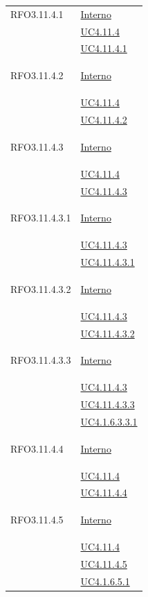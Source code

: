\begin{longtable}{|>{\centering}m{5cm}|m{5cm}<{\centering}|}
\hypertarget{RFO3.11.4.1}{RFO3.11.4.1} & \hyperlink{Interno}{Interno}\\
&\hyperref[UC4.11.4]{UC4.11.4}\\
&\hyperref[UC4.11.4.1]{UC4.11.4.1}\\ \hline

\hypertarget{RFO3.11.4.2}{RFO3.11.4.2} & \hyperlink{Interno}{Interno}\\
&\hyperref[UC4.11.4]{UC4.11.4}\\
&\hyperref[UC4.11.4.2]{UC4.11.4.2}\\ \hline

\hypertarget{RFO3.11.4.3}{RFO3.11.4.3} & \hyperlink{Interno}{Interno}\\
&\hyperref[UC4.11.4]{UC4.11.4}\\
&\hyperref[UC4.11.4.3]{UC4.11.4.3}\\ \hline

\hypertarget{RFO3.11.4.3.1}{RFO3.11.4.3.1} & \hyperlink{Interno}{Interno}\\
& \hyperref[UC4.11.4.3]{UC4.11.4.3}\\
& \hyperref[UC4.11.4.3.1]{UC4.11.4.3.1}\\ \hline

\hypertarget{RFO3.11.4.3.2}{RFO3.11.4.3.2} & \hyperlink{Interno}{Interno}\\
& \hyperref[UC4.11.4.3]{UC4.11.4.3}\\
& \hyperref[UC4.11.4.3.2]{UC4.11.4.3.2}\\ \hline

\hypertarget{RFO3.11.4.3.3}{RFO3.11.4.3.3} & \hyperlink{Interno}{Interno}\\
& \hyperref[UC4.11.4.3]{UC4.11.4.3}\\
&\hyperref[UC4.11.4.3.3]{UC4.11.4.3.3}\\
&\hyperref[UC4.1.6.3.3.1]{UC4.1.6.3.3.1}\\ \hline

\hypertarget{RFO3.11.4.4}{RFO3.11.4.4} & \hyperlink{Interno}{Interno}\\
&\hyperref[UC4.11.4]{UC4.11.4}\\
&\hyperref[UC4.11.4.4]{UC4.11.4.4}\\ \hline

\hypertarget{RFO3.11.4.5}{RFO3.11.4.5} & \hyperlink{Interno}{Interno}\\
&\hyperref[UC4.11.4]{UC4.11.4}\\
&\hyperref[UC4.11.4.5]{UC4.11.4.5}\\ 
&\hyperref[UC4.1.6.5.1]{UC4.1.6.5.1}\\ \hline


\end{longtable}
